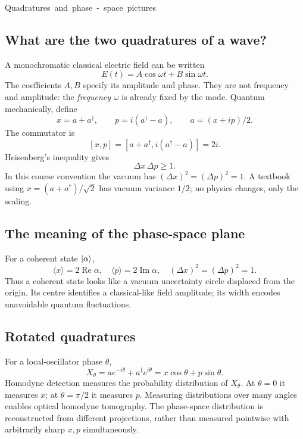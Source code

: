 \unit{Quadratures and phase-space pictures}
\subsection{What are the two quadratures of a wave?}
A monochromatic classical electric field can be written
\[
E(t)=A\cos\omega t+B\sin\omega t.
\]
The coefficients \(A,B\) specify its amplitude and
phase. They are not frequency and amplitude: the
\emph{frequency} \(\omega\) is already fixed by
the mode. Quantum mechanically, define
\[
\boxed{x=a+a^\dagger,\qquad
p=i(a^\dagger-a),\qquad a=(x+ip)/2.}
\]
The commutator is
\[
[x,p]=[a+a^\dagger,i(a^\dagger-a)]
=2i.
\]
Heisenberg's inequality gives
\[
\boxed{\Delta x\,\Delta p\ge1.}
\]
In this course convention the vacuum has
\((\Delta x)^2=(\Delta p)^2=1\).
A textbook using \(x=(a+a^\dagger)/\sqrt2\)
has vacuum variance \(1/2\); no physics
changes, only the scaling.

\subsection{The meaning of the phase-space plane}
For a coherent state \(\left\lvert \alpha\right\rangle\),
\[
\langle x\rangle=2\operatorname{Re}\alpha,\quad
\langle p\rangle=2\operatorname{Im}\alpha,\quad
(\Delta x)^2=(\Delta p)^2=1.
\]
Thus a coherent state looks like a
vacuum uncertainty circle displaced from the
origin. Its centre identifies a classical-like
field amplitude; its width encodes unavoidable
quantum fluctuations.

\begin{center}
\end{center}

\subsection{Rotated quadratures}
For a local-oscillator phase \(\theta\),
\[
\boxed{X_\theta=ae^{-i\theta}
+a^\dagger e^{i\theta}
=x\cos\theta+p\sin\theta.}
\]
Homodyne detection measures the probability
distribution of \(X_\theta\). At \(\theta=0\)
it measures \(x\); at \(\theta=\pi/2\)
it measures \(p\). Measuring distributions
over many angles enables optical homodyne
tomography. The phase-space distribution
is reconstructed from different projections,
rather than measured pointwise with
arbitrarily sharp \(x,p\) simultaneously.

